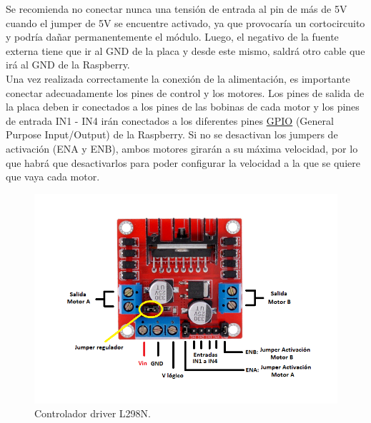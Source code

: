 Se recomienda no conectar nunca una tensión de entrada al pin de más de 5V cuando el jumper de 5V se encuentre activado, ya que provocaría un cortocircuito y podría dañar permanentemente el módulo. Luego, el negativo de la fuente externa tiene que ir al GND de la placa y desde este mismo, saldrá otro cable que irá al GND de la Raspberry.\\

Una vez realizada correctamente la conexión de la alimentación, es importante conectar adecuadamente los pines de control y los motores. Los pines de salida de la placa deben ir conectados a los pines de las bobinas de cada motor y los pines de entrada IN1 - IN4 irán conectados a los diferentes pines \hyperlink{GPIO}{GPIO} (General Purpose Input/Output) de la Raspberry. Si no se desactivan los jumpers de activación (ENA y ENB), ambos motores girarán a su máxima velocidad, por lo que habrá que desactivarlos para poder configurar la velocidad a la que se quiere que vaya cada motor.

\begin{figure}[H]
  \centering
  \includegraphics[scale=0.6]{figs/L298N} %
  \caption{Controlador driver L298N.}
  \label{fig:l298n}
\end{figure}

